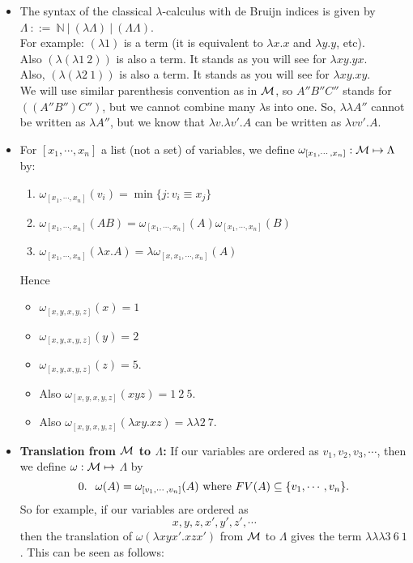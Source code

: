 \documentclass[11pt]{article}
\newcommand{\la}{\lambda}
\newcommand \cM {\cal M}
\begin{document}
\begin{itemize}
\item
The syntax of the classical $\lambda$-calculus with de Bruijn indices is given by\\
$\Lambda  \: ::=  \:  {\mathbb{N}} \:|\: ( \la{}{\Lambda}) \:|\: ( \Lambda \Lambda)$.\\
For example: $(\la 1)$ is a term (it is equivalent to $\la x.x$ and $\la y.y$, etc). \\
Also $(\la (\la 1 \: 2))$ is also a term. It stands as you will see for $\la xy.yx$.\\
Also, $(\la (\la 2 \: 1))$ is also a term. It stands as you will see for $\la xy.xy$.\\
We will use similar parenthesis convention as in ${\cal M}$, so $A''B''C''$ stands for $((A''B'')C'')$, but we cannot combine many $\la$s into one.  So, $\la \la A''$ cannot be written as $\la A''$,  but we know that $\la v.\la v'.A$ can be written as $\la vv'.A$.
\item
 For $[x_1,\cdots, x_n]$ a list (not a set) of variables, 
we define $\omega_{[x_1,\cdots, x_n]}: \cM \mapsto \mbox{$\Lambda$}$ by:
\begin{enumerate}
\item
$\omega_{[x_1,\cdots, x_n]}(v_i) = \min\{j:v_i \equiv x_j\}$
\item
$\omega_{[x_1,\cdots, x_n]}(AB) = \omega_{[x_1,\cdots, x_n]}(A)\omega_{[x_1,\cdots, x_n]}(B)$
\item
$\omega_{[x_1,\cdots, x_n]}(\lambda x.A)= \lambda \omega_{[x,x_1,\cdots, x_n]}(A)$
\end{enumerate}
Hence \begin{itemize}
\item
$\omega_{[x, y, x,y,z]}(x) = 1$
\item
$\omega_{[x, y, x,y,z]}(y) = 2$
\item
$\omega_{[x, y, x,y,z]}(z) = 5$.
\item
Also $\omega_{[x, y, x,y,z]}(xyz) = 1\:2\:5$.
\item
Also $\omega_{[x, y, x,y,z]}(\lambda xy.xz) = \lambda \lambda 2\:7$.
\end{itemize}
\item
{\bf Translation from ${\cal M}$ to $\Lambda$:}
If our variables are ordered as  $v_1, v_2, v_3, \cdots$, then we 
define $\omega : \cM \mapsto$ $\Lambda$
by  $$0.\hspace{0.1in}\omega(A) = \omega_{[v_1,\cdots, v_n]}(A)  \mbox{ where 
$FV(A) \subseteq \{v_1,\cdots,v_n\}$}.$$
So for example, if our variables are ordered as $$x,y,z,x',y',z', \cdots$$ then the translation of $\omega(\lambda xyx'.xzx')$ from ${\cal M}$ to $\Lambda$ gives the term $ \lambda\lambda\lambda 3\: 6\:1$.  This can be seen as follows:  \\

\end{itemize}
\end{document}
